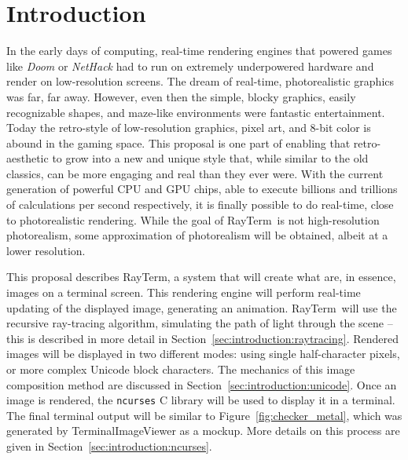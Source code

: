 \documentclass[11pt]{article}
\newcommand{\name}{{\sc RayTerm}}
\begin{document}
\section{Introduction}
\label{sec:introduction}


In the early days of computing, real-time rendering engines that powered games like {\it Doom} or {\it NetHack} had to run on extremely underpowered hardware and render on low-resolution screens.
The dream of real-time, photorealistic graphics was far, far away.
However, even then the simple, blocky graphics, easily recognizable shapes, and maze-like environments were fantastic entertainment.
Today the retro-style of low-resolution graphics, pixel art, and 8-bit color is abound in the gaming space.
This proposal is one part of enabling that retro-aesthetic to grow into a new and unique style that, while similar to the old classics, can be more engaging and real than they ever were.
With the current generation of powerful CPU and GPU chips, able to execute billions and trillions of calculations per second respectively, it is finally possible to do real-time, close to photorealistic rendering.
While the goal of \name\ is not high-resolution photorealism, some approximation of photorealism will be obtained, albeit at a lower resolution.


This proposal describes \name, a system that will create what are, in essence, images on a terminal screen.
This rendering engine will perform real-time updating of the displayed image, generating an animation.
\name\ will use the recursive ray-tracing algorithm, simulating the path of light through the scene -- this is described in more detail in Section~\ref{sec:introduction:raytracing}.
Rendered images will be displayed in two different modes: using single half-character pixels, or more complex Unicode block characters.
The mechanics of this image composition method are discussed in Section~\ref{sec:introduction:unicode}.
Once an image is rendered, the \texttt{ncurses} C library \cite{ncursesLibrary} will be used to display it in a terminal.
The final terminal output will be similar to Figure~\ref{fig:checker_metal}, which was generated by TerminalImageViewer \cite{tivGithub} as a mockup.
More details on this process are given in Section~\ref{sec:introduction:ncurses}.
\end{document}
